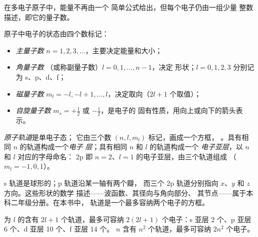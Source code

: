 在多电子原子中，能量不再由一个
简单公式给出，但每个电子仍由一组少量
整数描述，即它的量子数。

\begin{definition}[量子数]\label{def:b1:quantum-numbers:quantum-number}
原子中电子的状态由四个数标记：
\begin{itemize}
  \item \emph{主量子数}
        $n = 1, 2, 3, \dots$，主要决定能量和大小；
  \item \emph{角量子数}
        （或称副量子数）$l = 0, 1, \dots, n-1$，决定
        形状；$l = 0, 1, 2, 3$ 分别记为 s、p、d、f；
  \item \emph{磁量子数}
        $m_l = -l, -l+1, \dots, l$，决定取向（$2l + 1$
        个取值）；
  \item \emph{自旋量子数}
        $m_s = +\tfrac12$ 或 $-\tfrac12$，是电子的
        固有性质，用向上或向下的箭头表示。
\end{itemize}
\end{definition}

\begin{definition}\label{def:b1:quantum-numbers:orbital}
\emph{原子轨道}是单电子态；
它由三个数 $(n, l, m_l)$ 标记，画成一个方框，
\omorbs{}。具有相同 $n$ 的轨道构成一个\emph{电子
层}；具有相同 $n$ 和 $l$ 的轨道构成一个
\emph{电子亚层}，以 $n$ 和 $l$ 对应的字母命名：
2p 即 $n = 2$、$l = 1$ 的电子亚层，由三个轨道组成
（$m_l = -1, 0, 1$）。
\end{definition}

\begin{remark}[形状]\label{rem:b1:quantum-numbers:shapes}
s 轨道是球形的；p 轨道沿某一轴有两个瓣，
而三个 2p 轨道分别指向 $x$、$y$ 和 $z$ 方向。这些形状的数学
描述——波函数、其径向与角向部分、
其节点——属于本科二年级分册。在本书中，
轨道是一个最多容纳两个电子的方框。
\end{remark}

\begin{proposition}[电子亚层与电子层的容量]\label{prop:b1:quantum-numbers:capacity}
为 $l$ 的含有 $2l + 1$ 个轨道，最多可容纳
$2(2l + 1)$ 个电子：s 亚层 2 个、p 亚层 6 个、d 亚层 10 个、f 亚层 14 个。 $n$
含有 $n^2$ 个轨道，最多可容纳 $2n^2$ 个电子。
\end{proposition}

